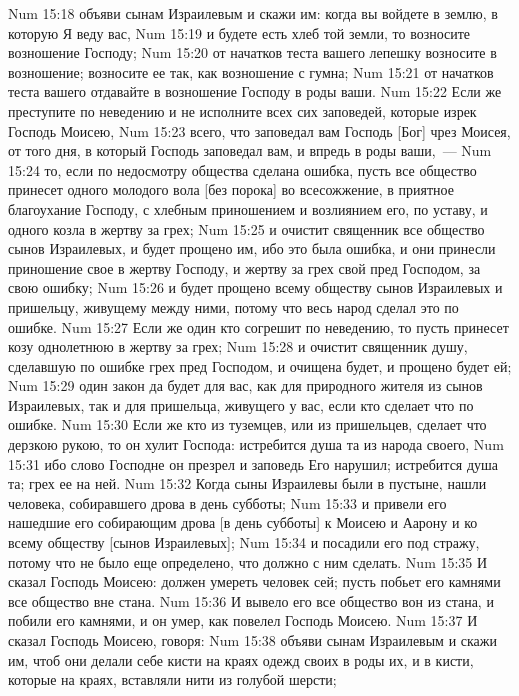 \vs Num 15:18 объяви сынам Израилевым и скажи им: когда вы войдете в землю, в которую Я веду вас,
\vs Num 15:19 и будете есть хлеб той земли, то возносите возношение Господу;
\vs Num 15:20 от начатков теста вашего лепешку возносите в возношение; возносите ее так, как возношение с гумна;
\vs Num 15:21 от начатков теста вашего отдавайте в возношение Господу в роды ваши.
\vs Num 15:22 Если же преступите по неведению и не исполните всех сих заповедей, которые изрек Господь Моисею,
\vs Num 15:23 всего, что заповедал вам Господь [Бог] чрез Моисея, от того дня, в который Господь заповедал вам, и впредь в роды ваши,~---
\vs Num 15:24 то, если по недосмотру общества сделана ошибка, пусть все общество принесет одного молодого вола [без порока] во всесожжение, в приятное благоухание Господу, с хлебным приношением и возлиянием его, по уставу, и одного козла в жертву за грех;
\vs Num 15:25 и очистит священник все общество сынов Израилевых, и будет прощено им, ибо это была ошибка, и они принесли приношение свое в жертву Господу, и жертву за грех свой пред Господом, за свою ошибку;
\vs Num 15:26 и будет прощено всему обществу сынов Израилевых и пришельцу, живущему между ними, потому что весь народ сделал это по ошибке.
\vs Num 15:27 Если же один кто согрешит по неведению, то пусть принесет козу однолетнюю в жертву за грех;
\vs Num 15:28 и очистит священник душу, сделавшую по ошибке грех пред Господом, и очищена будет, и прощено будет ей;
\vs Num 15:29 один закон да будет для вас, как для природного жителя из сынов Израилевых, так и для пришельца, живущего у вас, если кто сделает что по ошибке.
\vs Num 15:30 Если же кто из туземцев, или из пришельцев, сделает что дерзкою рукою, то он хулит Господа: истребится душа та из народа своего,
\vs Num 15:31 ибо слово Господне он презрел и заповедь Его нарушил; истребится душа та; грех ее на ней.
\rsbpar\vs Num 15:32 Когда сыны Израилевы были в пустыне, нашли человека, собиравшего дрова в день субботы;
\vs Num 15:33 и привели его нашедшие его собирающим дрова [в день субботы] к Моисею и Аарону и ко всему обществу [сынов Израилевых];
\vs Num 15:34 и посадили его под стражу, потому что не было еще определено, что должно с ним сделать.
\vs Num 15:35 И сказал Господь Моисею: должен умереть человек сей; пусть побьет его камнями все общество вне стана.
\vs Num 15:36 И вывело его все общество вон из стана, и побили его камнями, и он умер, как повелел Господь Моисею.
\rsbpar\vs Num 15:37 И сказал Господь Моисею, говоря:
\vs Num 15:38 объяви сынам Израилевым и скажи им, чтоб они делали себе кисти на краях одежд своих в роды их, и в кисти, которые на краях, вставляли нити из голубой шерсти;
